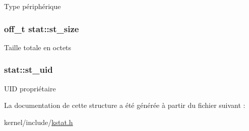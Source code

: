 Type périphérique \hypertarget{structstat_a040e19c8b9766f841fde8786ce9297bf}{
\subsubsection[{st\-\_\-size}]{\setlength{\rightskip}{0pt plus 5cm}off\-\_\-t stat\-::st\-\_\-size}}\label{structstat_a040e19c8b9766f841fde8786ce9297bf}
Taille totale en octets \hypertarget{structstat_a4a8708a3d18be60ee7b2f06c4cab0c70}{
\subsubsection[{st\-\_\-uid}]{ stat\-::st\-\_\-uid}}\label{structstat_a4a8708a3d18be60ee7b2f06c4cab0c70}
U\-I\-D propriétaire 

La documentation de cette structure a été générée à partir du fichier suivant \-:\begin{DoxyCompactItemize}
\item 
kernel/include/\hyperlink{kstat_8h}{kstat.\-h}\end{DoxyCompactItemize}
